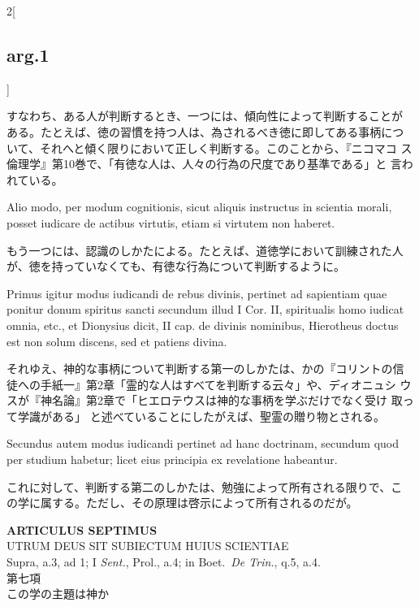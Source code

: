 \documentclass[
paper=a4paper,
fontsize=10pt,
jafontsize=9pt,
titlepage
]{jlreq}
\begin{document}
\begin{paracol}{2}[\subsection{arg.1}]
\switchcolumn

すなわち、ある人が判断するとき、一つには、傾向性によって判断することが
ある。たとえば、徳の習慣を持つ人は、為されるべき徳に即してある事柄につ
いて、それへと傾く限りにおいて正しく判断する。このことから、『ニコマコ
ス倫理学』第10巻で、「有徳な人は、人々の行為の尺度であり基準である」と
言われている。

\switchcolumn*

Alio modo, per modum cognitionis, sicut aliquis instructus in scientia
morali, posset iudicare de actibus virtutis, etiam si virtutem non
haberet.

\switchcolumn

もう一つには、認識のしかたによる。たとえば、道徳学において訓練された人
が、徳を持っていなくても、有徳な行為について判断するように。

\switchcolumn*

Primus igitur modus iudicandi de rebus divinis, pertinet ad sapientiam
quae ponitur donum spiritus sancti secundum illud I Cor. II,
spiritualis homo iudicat omnia, etc., et Dionysius dicit, II cap. de
divinis nominibus, Hierotheus doctus est non solum discens, sed et
patiens divina.

\switchcolumn

それゆえ、神的な事柄について判断する第一のしかたは、かの『コリントの信
徒への手紙一』第2章「霊的な人はすべてを判断する云々」や、ディオニュシ
ウスが『神名論』第2章で「ヒエロテウスは神的な事柄を学ぶだけでなく受け
取って学識がある」 と述べていることにしたがえば、聖霊の贈り物とされる。

\switchcolumn*

Secundus autem modus iudicandi pertinet ad hanc doctrinam, secundum
quod per studium habetur; licet eius principia ex revelatione
habeantur.

\switchcolumn

これに対して、判断する第二のしかたは、勉強によって所有される限りで、こ
の学に属する。ただし、その原理は啓示によって所有されるのだが。

\end{paracol}
\newpage

{}
\setcounter{section}{7}
\setcounter{subsection}{0}
\begin{center}
 {\Large {\bfseries ARTICULUS SEPTIMUS}}\\
 {\large UTRUM DEUS SIT SUBIECTUM HUIUS SCIENTIAE}\\
 {\footnotesize Supra, a.3, ad 1; I {\itshape Sent.}, Prol., a.4; in
 Boet.~{\itshape De Trin.}, q.5, a.4.}\\
 {\Large 第七項\\この学の主題は神か}
\end{center}
\end{document}
